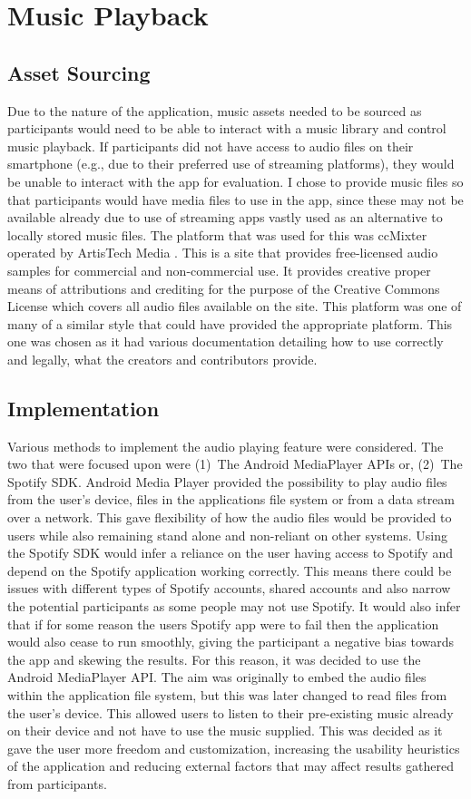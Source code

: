 \documentclass{l4proj}
\begin{document}
\section{Music Playback}

\subsection{Asset Sourcing}
Due to the nature of the application, music assets needed to be sourced as participants would need to be able to interact with a music library and control music playback. If participants did not have access to audio files on their smartphone (e.g., due to their preferred use of streaming platforms), they would be unable to interact with the app for evaluation. I chose to provide music files so that participants would have media files to use in the app, since these may not be available already due to use of streaming apps vastly used as an alternative to locally stored music files. The platform that was used for this was ccMixter operated by ArtisTech Media . This is a site that provides free-licensed audio samples for commercial and non-commercial use. It provides creative proper means of attributions and crediting for the purpose of the Creative Commons License which covers all audio files available on the site. This platform was one of many of a similar style that could have provided the appropriate platform. This one was chosen as it had various documentation detailing how to use correctly and legally, what the creators and contributors provide.

\subsection{Implementation}
Various methods to implement the audio playing feature were considered. The two that were focused upon were (1)~The Android MediaPlayer APIs or, (2)~The Spotify SDK. Android Media Player provided the possibility to play audio files from the user’s device, files in the applications file system or from a data stream over a network. This gave flexibility of how the audio files would be provided to users while also remaining stand alone and non-reliant on other systems. Using the Spotify SDK would infer a reliance on the user having access to Spotify and depend on the Spotify application working correctly. This means there could be issues with different types of Spotify accounts, shared accounts and also narrow the potential participants as some people may not use Spotify. It would also infer that if for some reason the users Spotify app were to fail then the application would also cease to run smoothly, giving the participant a negative bias towards the app and skewing the results. For this reason, it was decided to use the Android MediaPlayer API. The aim was originally to embed the audio files within the application file system, but this was later changed to read files from the user’s device. This allowed users to listen to their pre-existing music already on their device and not have to use the music supplied. This was decided as it gave the user more freedom and customization, increasing the usability heuristics of the application and reducing external factors that may affect results gathered from participants.
\end{document}
